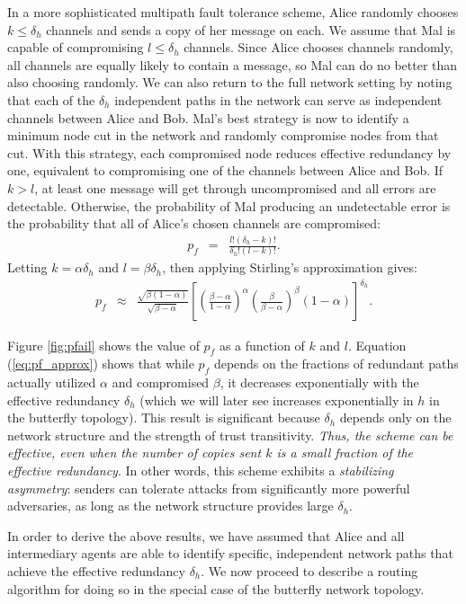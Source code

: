 \documentclass[twocolumn]{article}
\newcommand{\beq}{\begin{eqnarray}}
\newcommand{\eeq}{\end{eqnarray}}
\begin{document}
In a more sophisticated multipath fault tolerance scheme,
Alice randomly chooses $k \leq \delta_h$ channels and sends a copy of
her message on each.
We assume that Mal is capable of compromising $l \leq \delta_h$ channels.
Since Alice chooses channels randomly,
all channels are equally likely to contain a message,
so Mal can do no better than also choosing randomly.
We can also return to the full network setting by noting that each of the
$\delta_h$ independent paths in the network can serve as independent channels
between Alice and Bob.
Mal's best strategy is now to identify a minimum node cut in the network
and randomly compromise nodes from that cut.
With this strategy, each compromised node reduces effective redundancy by one,
equivalent to compromising one of the channels between Alice and Bob.
If $k > l$, at least one message will get through uncompromised and all
errors are detectable.
Otherwise, the probability of Mal producing an undetectable error is
the probability that all of Alice's chosen channels are compromised:
\beq
\label{eq:pf}
p_f &=& \frac{l!(\delta_h-k)!}{\delta_h!(l-k)!}.
\eeq
Letting $k=\alpha \delta_h$ and $l=\beta \delta_h$, then applying Stirling's
approximation gives:
\begin{eqnarray}
\label{eq:pf_approx}
p_f &\approx&
\frac{\sqrt{\beta(1-\alpha)}}{\sqrt{\beta-\alpha}}
\left[
    \left( \frac{\beta-\alpha}{1-\alpha} \right)^{\alpha}
    \left( \frac{\beta}{\beta-\alpha} \right)^{\beta}
    (1-\alpha)
\right]^{\delta_h}.
\end{eqnarray}

Figure \ref{fig:pfail} shows the value of $p_f$
as a function of $k$ and $l$.
Equation (\ref{eq:pf_approx}) shows that while $p_f$
depends on the fractions of
redundant paths actually utilized $\alpha$ and compromised $\beta$,
it decreases exponentially with the effective redundancy $\delta_h$
(which we will later see increases exponentially in $h$ in the
butterfly topology).
This result is significant because $\delta_h$
depends only on the network structure
and the strength of trust transitivity.
{\em Thus, the scheme can be effective, even when the number of copies
sent $k$ is a small fraction of the effective redundancy}.
In other words, this scheme exhibits a {\em stabilizing asymmetry}:
senders can tolerate attacks from significantly more powerful
adversaries,
as long as the network structure provides large $\delta_h$.

In order to derive the above results,
we have assumed that Alice and all
intermediary agents are able to identify specific,
independent network paths that achieve the effective redundancy $\delta_h$.
We now proceed to describe a routing algorithm for doing so in the special case
of the butterfly network topology.
\end{document}
